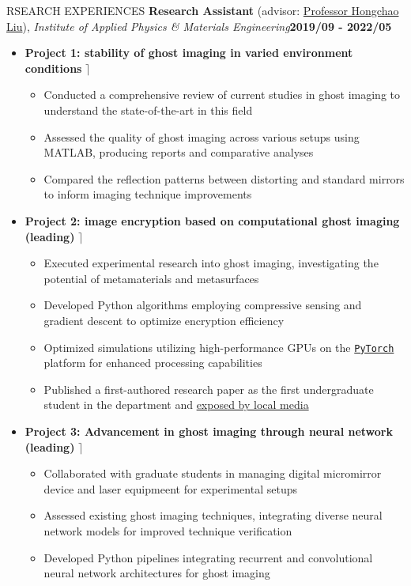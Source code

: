 \documentclass[10pt]{article} %
\begin{document}
\begin{section}{RSEARCH EXPERIENCES}
\textbf{Research Assistant} (advisor: \href{mailto:hcliu@um.edu.mo}{Professor Hongchao Liu}), \textit{Institute of Applied Physics \& Materials Engineering}\hfill \textbf{2019/09 - 2022/05} 
\begin{itemize}[leftmargin=1.5em]
    \item \textbf{Project 1: stability of ghost imaging in varied environment conditions} \hfill $\rceil$ %
    \begin{itemize}[leftmargin=1.5em]
        \item Conducted a comprehensive review of current studies in ghost imaging to understand the state-of-the-art in this field
        \item Assessed the quality of ghost imaging across various setups using MATLAB, producing reports and comparative analyses
        \item Compared the reflection patterns between distorting and standard mirrors to inform imaging technique improvements
    \end{itemize}
    \item \textbf{Project 2: image encryption based on computational ghost imaging (leading)} \hfill $\rceil$ %
    \begin{itemize}[leftmargin=1.5em]
        \item Executed experimental research into ghost imaging, investigating the potential of metamaterials and metasurfaces
        \item Developed Python algorithms employing compressive sensing and gradient descent to optimize encryption efficiency
        \item Optimized simulations utilizing high-performance GPUs on the \href{https://pytorch.org/}{\texttt{PyTorch}} platform for enhanced processing capabilities
        \item Published a first-authored research paper as the first undergraduate student in the department and \href{https://www.tdm.com.mo/en/news-detail/683438?isvideo=false&lang=en&category=all}{exposed by local media} 
    \end{itemize}
    \item \textbf{Project 3: Advancement in ghost imaging through neural network (leading)} \hfill $\rceil$ %
    \begin{itemize}[leftmargin=1.5em]
        \item Collaborated with graduate students in managing digital micromirror device and laser equipmeent for experimental setups
        \item Assessed existing ghost imaging techniques, integrating diverse neural network models for improved technique verification
        \item Developed Python pipelines integrating recurrent and convolutional neural network architectures for ghost imaging
    \end{itemize}
\end{itemize}

\end{section}
\end{document}
